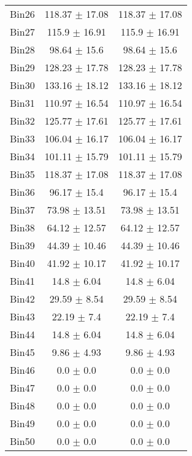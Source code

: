 \begin{tabular}{|c|c|c|}
     Bin26 & 118.37 $\pm$ 17.08 & 118.37 $\pm$ 17.08 \\ \cline{1-3} 
     Bin27 & 115.9 $\pm$ 16.91 & 115.9 $\pm$ 16.91 \\ \cline{1-3} 
     Bin28 & 98.64 $\pm$ 15.6 & 98.64 $\pm$ 15.6 \\ \cline{1-3} 
     Bin29 & 128.23 $\pm$ 17.78 & 128.23 $\pm$ 17.78 \\ \cline{1-3} 
     Bin30 & 133.16 $\pm$ 18.12 & 133.16 $\pm$ 18.12 \\ \cline{1-3} 
     Bin31 & 110.97 $\pm$ 16.54 & 110.97 $\pm$ 16.54 \\ \cline{1-3} 
     Bin32 & 125.77 $\pm$ 17.61 & 125.77 $\pm$ 17.61 \\ \cline{1-3} 
     Bin33 & 106.04 $\pm$ 16.17 & 106.04 $\pm$ 16.17 \\ \cline{1-3} 
     Bin34 & 101.11 $\pm$ 15.79 & 101.11 $\pm$ 15.79 \\ \cline{1-3} 
     Bin35 & 118.37 $\pm$ 17.08 & 118.37 $\pm$ 17.08 \\ \cline{1-3} 
     Bin36 & 96.17 $\pm$ 15.4 & 96.17 $\pm$ 15.4 \\ \cline{1-3} 
     Bin37 & 73.98 $\pm$ 13.51 & 73.98 $\pm$ 13.51 \\ \cline{1-3} 
     Bin38 & 64.12 $\pm$ 12.57 & 64.12 $\pm$ 12.57 \\ \cline{1-3} 
     Bin39 & 44.39 $\pm$ 10.46 & 44.39 $\pm$ 10.46 \\ \cline{1-3} 
     Bin40 & 41.92 $\pm$ 10.17 & 41.92 $\pm$ 10.17 \\ \cline{1-3} 
     Bin41 & 14.8 $\pm$ 6.04 & 14.8 $\pm$ 6.04 \\ \cline{1-3} 
     Bin42 & 29.59 $\pm$ 8.54 & 29.59 $\pm$ 8.54 \\ \cline{1-3} 
     Bin43 & 22.19 $\pm$ 7.4 & 22.19 $\pm$ 7.4 \\ \cline{1-3} 
     Bin44 & 14.8 $\pm$ 6.04 & 14.8 $\pm$ 6.04 \\ \cline{1-3} 
     Bin45 & 9.86 $\pm$ 4.93 & 9.86 $\pm$ 4.93 \\ \cline{1-3} 
     Bin46 & 0.0 $\pm$ 0.0 & 0.0 $\pm$ 0.0 \\ \cline{1-3} 
     Bin47 & 0.0 $\pm$ 0.0 & 0.0 $\pm$ 0.0 \\ \cline{1-3} 
     Bin48 & 0.0 $\pm$ 0.0 & 0.0 $\pm$ 0.0 \\ \cline{1-3} 
     Bin49 & 0.0 $\pm$ 0.0 & 0.0 $\pm$ 0.0 \\ \cline{1-3} 
     Bin50 & 0.0 $\pm$ 0.0 & 0.0 $\pm$ 0.0 \\ \cline{1-3} 

\end{tabular}
